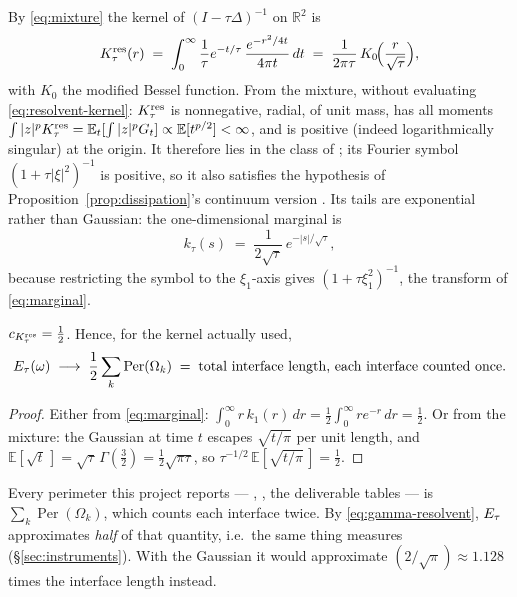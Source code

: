 \documentclass[11pt,a4paper]{article}
\begin{document}
By \eqref{eq:mixture} the kernel of $(I - \tau\Delta)^{-1}$ on $\mathbb{R}^2$ is
\begin{equation}
  K^{\mathrm{res}}_\tau(r) \;=\; \int_0^\infty \frac{1}{\tau} e^{-t/\tau}\, \frac{e^{-r^2/4t}}{4\pi t}\, dt
  \;=\; \frac{1}{2\pi\tau}\, K_0\!\Bigl(\frac{r}{\sqrt\tau}\Bigr),
  \label{eq:resolvent-kernel}
\end{equation}
with $K_0$ the modified Bessel function. From the mixture, without evaluating
\eqref{eq:resolvent-kernel}: $K^{\mathrm{res}}_\tau$ is nonnegative, radial, of unit mass, has all
moments $\int |z|^p K^{\mathrm{res}}_\tau = \mathbb{E}_t[\int |z|^p G_t] \propto \mathbb{E}[t^{p/2}] < \infty$,
and is positive (indeed logarithmically singular) at the origin. It therefore
lies in the class of \cite[Theorem~5.1]{esedoglu2017kernels}; its Fourier symbol
$(1 + \tau|\xi|^2)^{-1}$ is positive, so it also satisfies the hypothesis of
Proposition~\ref{prop:dissipation}'s continuum version
\cite[\S5.2]{esedoglu2015threshold}. Its tails are exponential rather than
Gaussian: the one-dimensional marginal is
\begin{equation}
  k_\tau(s) \;=\; \frac{1}{2\sqrt\tau}\, e^{-|s|/\sqrt\tau},
  \label{eq:marginal}
\end{equation}
because restricting the symbol to the $\xi_1$-axis gives $(1 + \tau\xi_1^2)^{-1}$,
the transform of \eqref{eq:marginal}.

\begin{prop}
\label{prop:constant}
$c_{K^{\mathrm{res}}_\tau} = \tfrac12$. Hence, for the kernel actually used,
\begin{equation}
  E_\tau(\omega) \;\longrightarrow\; \frac12 \sum_k \operatorname{Per}(\Omega_k)
  \;=\; \text{total interface length, each interface counted once.}
  \label{eq:gamma-resolvent}
\end{equation}
\end{prop}
\begin{proof}
Either from \eqref{eq:marginal}:
$\int_0^\infty r\, k_1(r)\, dr = \tfrac12 \int_0^\infty r e^{-r}\, dr = \tfrac12$.
Or from the mixture: the Gaussian at time $t$ escapes $\sqrt{t/\pi}$ per unit
length, and $\mathbb{E}[\sqrt t\,] = \sqrt\tau\,\Gamma(\tfrac32) = \tfrac12\sqrt{\pi\tau}$,
so $\tau^{-1/2}\, \mathbb{E}[\sqrt{t/\pi}\,] = \tfrac12$.
\end{proof}

\begin{remark}
Every perimeter this project reports --- ,
, the deliverable tables --- is $\sum_k \operatorname{Per}(\Omega_k)$,
which counts each interface twice. By \eqref{eq:gamma-resolvent}, $E_\tau$
approximates \emph{half} of that quantity, i.e.\ the same thing
 measures (\S\ref{sec:instruments}). With the
Gaussian it would approximate $(2/\sqrt\pi) \approx 1.128$ times the interface
length instead.
\end{remark}
\end{document}
